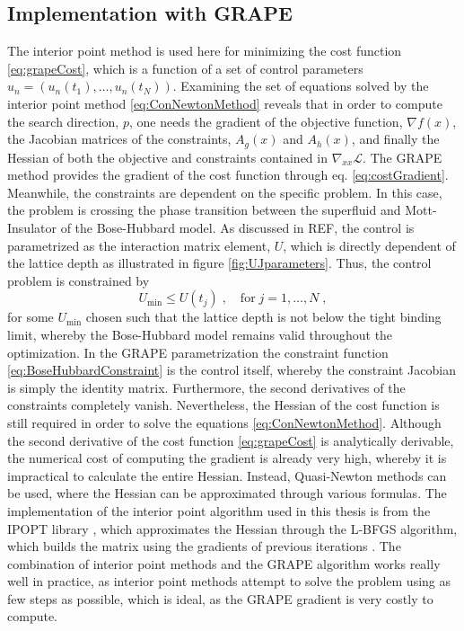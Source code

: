 \subsection{Implementation with GRAPE} \label{sec:IpoptGRAPE}
The interior point method is used here for minimizing the cost function \eqref{eq:grapeCost}, which is a function of a set of control parameters $u_n = \left( u_n (t_1) , \ldots , u_n (t_N)  \right)$. Examining the set of equations solved by the interior point method \eqref{eq:ConNewtonMethod} reveals that in order to compute the search direction, $p$, one needs the gradient of the objective function, $\nabla f(x)$, the Jacobian matrices of the constraints, $A_g (x)$ and $A_h (x)$, and finally the Hessian of both the objective and constraints contained in $\nabla_{xx} \mathcal{L}$.
The GRAPE method provides the gradient of the cost function through eq. \eqref{eq:costGradient}. 
Meanwhile, the constraints are dependent on the specific problem. In this case, the problem is crossing the phase transition between the superfluid and Mott-Insulator of the Bose-Hubbard model. As discussed in REF, the control is parametrized as the interaction matrix element, $U$, which is directly dependent of the lattice depth as illustrated in figure \ref{fig:UJparameters}. Thus, the control problem is constrained by 
\begin{equation}
	U_{\mathrm{min}} \leq U(t_j) \; , \quad \mathrm{for} \; j = 1 , \ldots , N \; ,
	\label{eq:BoseHubbardConstraint}
\end{equation} 
for some $U_{\mathrm{min}}$ chosen such that the lattice depth is not below the tight binding limit, whereby the Bose-Hubbard model remains valid throughout the optimization. In the GRAPE parametrization the constraint function \eqref{eq:BoseHubbardConstraint} is the control itself, whereby the constraint Jacobian is simply the identity matrix. 
Furthermore, the second derivatives of the constraints completely vanish. Nevertheless, the Hessian of the cost function is still required in order to solve the equations \eqref{eq:ConNewtonMethod}. Although the second derivative of the cost function \eqref{eq:grapeCost} is analytically derivable, the numerical cost of computing the gradient is already very high, whereby it is impractical to calculate the entire Hessian. Instead, Quasi-Newton methods can be used, where the Hessian can be approximated through various formulas. The implementation of the interior point algorithm used in this thesis is from the IPOPT library \cite{Wachter2006}, which approximates the Hessian through the L-BFGS algorithm, which builds the matrix using the gradients of previous iterations \cite{Liu1989}. The combination of interior point methods and the GRAPE algorithm works really well in practice, as interior point methods attempt to solve the problem using as few steps as possible, which is ideal, as the GRAPE gradient is very costly to compute.



